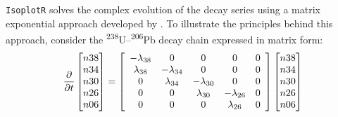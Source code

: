 \begin{refsection}
\texttt{IsoplotR} solves the complex evolution of the decay series
using a matrix exponential approach developed by \citet{mclean2016b}.
To illustrate the principles behind this approach, consider the
\textsuperscript{238}U--\textsuperscript{206}Pb decay chain expressed
in matrix form:
\begin{equation}
  \frac{\partial}{\partial{t}}\left[
    \begin{array}{@{}c@{}}
      n38\\
      n34\\
      n30\\
      n26\\
      n06
    \end{array}
  \right]
  =
  \left[
    \begin{array}{ccccc}
      -\lambda_{38} & 0 & 0 & 0 & 0 \\
      \lambda_{38} & -\lambda_{34} & 0 & 0 & 0 \\
      0 & \lambda_{34} & -\lambda_{30} & 0 & 0 \\
      0 & 0 & \lambda_{30} & -\lambda_{26} & 0 \\
      0 & 0 & 0 & \lambda_{26} & 0\\
    \end{array}
    \right]
  \left[
    \begin{array}{@{}c@{}}
      n38\\
      n34\\
      n30\\
      n26\\
      n06
    \end{array}
    \right]
  \label{eq:matrixdecay}
\end{equation}


\end{refsection}
